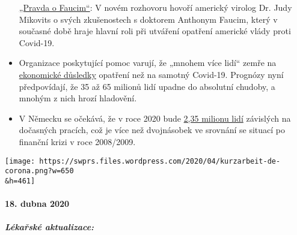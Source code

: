 \begin{itemize}
  \href{https://childrenshealthdefense.org/news/the-truth-about-fauci-featuring-dr-judy-mikovits/}{„Pravda
  o Faucim``}: V novém rozhovoru hovoří americký virolog Dr. Judy
  Mikovits o svých zkušenostech s doktorem Anthonym Faucim, který v
  současné době hraje hlavní roli při utváření opatření americké vlády
  proti Covid-19.
\item
  Organizace poskytující pomoc varují, že „mnohem více lidí`` zemře na
  \href{https://www.welt.de/wirtschaft/article207092745/Corona-Pandemie-Rezession-beschert-der-Welt-die-noch-groessere-Katastrophe.html}{ekonomické
  důsledky} opatření než na samotný Covid-19. Prognózy nyní
  předpovídají, že 35 až 65 milionů lidí upadne do absolutní chudoby, a
  mnohým z nich hrozí hladovění.
\item
  V Německu se očekává, že v roce 2020 bude
  \href{https://www.boeckler.de/pdf/p_wsi_pb_38_2020.pdf}{2,35 milionu
  lidí} závislých na dočasných pracích, což je více než dvojnásobek ve
  srovnání se situací po finanční krizi v roce 2008/2009.
\end{itemize}

\texttt{[image: https://swprs.files.wordpress.com/2020/04/kurzarbeit-de-corona.png?w=650\\\&h=461]}

\hypertarget{18-dubna-2020}{%
\paragraph{18. dubna 2020}\label{18-dubna-2020}}

\hypertarget{luxe9kaux159skuxe9-aktualizace-2}{%
\subparagraph{\texorpdfstring{\textbf{Lékařské
aktualizace:}}{Lékařské aktualizace:}}\label{luxe9kaux159skuxe9-aktualizace-2}}

